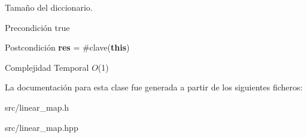 Tamaño del diccionario. 

\begin{DoxyPrecond}{Precondición}
true 
\end{DoxyPrecond}
\begin{DoxyPostcond}{Postcondición}
{\bfseries res} = \#clave({\bfseries this})
\end{DoxyPostcond}

\begin{DoxyDescription}
\item[Complejidad Temporal]$O$(1)
\end{DoxyDescription}

La documentación para esta clase fue generada a partir de los siguientes ficheros\-:\begin{DoxyCompactItemize}
\item 
src/linear\-\_\-map.\-h\item 
src/linear\-\_\-map.\-hpp\end{DoxyCompactItemize}
